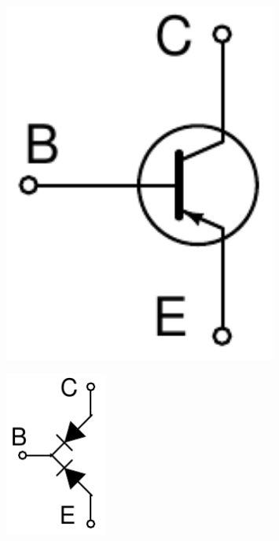 \documentclass[beamer]{standalone}
\begin{document}
\begin{frame}
\begin{columns}[t]
\begin{column}{.5\textwidth}
\begin{columns}[t]
			\begin{column}{.60\textwidth}
				\begin{figure}
					\includegraphics[width=0.80\textwidth]{./schematics/pnp_transistor.pdf}
				\end{figure}
				\begin{figure}
					\includegraphics[width=0.30\textwidth]{./schematics/pnp_diodes.pdf}
				\end{figure}
			\end{column}
		\end{columns}
	\end{column}
\end{columns}
\end{frame}
\end{document}
